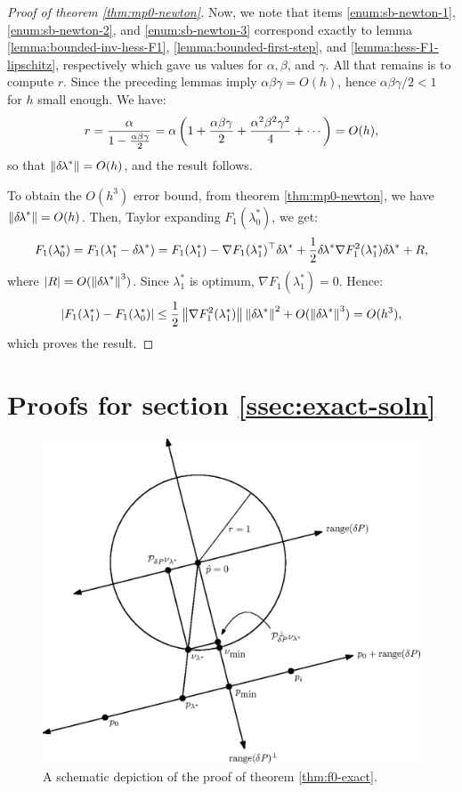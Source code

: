 \documentclass[smallcondensed]{svjour3}
\begin{document}
\begin{proof}[Proof of theorem \ref{thm:mp0-newton}]
  Now, we note that items \ref{enum:sb-newton-1},
  \ref{enum:sb-newton-2}, and \ref{enum:sb-newton-3} correspond
  exactly to lemma \ref{lemma:bounded-inv-hess-F1},
  \ref{lemma:bounded-first-step}, and \ref{lemma:hess-F1-lipschitz},
  respectively which gave us values for $\alpha, \beta$, and
  $\gamma$. All that remains is to compute $r$. Since the preceding
  lemmas imply $\alpha\beta\gamma = O(h)$, hence
  $\alpha\beta\gamma/2 < 1$ for $h$ small enough. We have:
  \begin{equation}
    r = \frac{\alpha}{1 - \frac{\alpha\beta\gamma}{2}} = \alpha \left(1 + \frac{\alpha\beta\gamma}{2} + \frac{\alpha^2\beta^2\gamma^2}{4} + \cdots\right) = O(h),
  \end{equation}
  so that $\left\|{\delta \hspace{-0.1em} \lambda}^*\right\| = O(h)$, and the result follows.

  To obtain the $O(h^3)$ error bound, from theorem
  \ref{thm:mp0-newton}, we have $\left\|{\delta \hspace{-0.1em} \lambda}^*\right\| = O(h)$. Then,
  Taylor expanding $F_1(\lambda_0^*)$, we get:
  \begin{equation*}
    F_1(\lambda_0^*)
    = F_1(\lambda_1^* - {\delta \hspace{-0.1em} \lambda}^*) = F_1(\lambda_1^*) - \nabla F_1(\lambda_1^*)^\top {\delta \hspace{-0.1em} \lambda}^* + \frac{1}{2} {\delta \hspace{-0.1em} \lambda}^* \nabla F_1^2(\lambda_1^*) {\delta \hspace{-0.1em} \lambda}^* + R,
  \end{equation*}
  where $\left|R\right| = O(\left\|{\delta \hspace{-0.1em} \lambda}^*\right\|^3)$. Since $\lambda_1^*$
  is optimum, $\nabla F_1(\lambda_1^*) = 0$. Hence:
  \begin{equation*}
    \left|F_1(\lambda_1^*) - F_1(\lambda_0^*)\right| \leq \frac{1}{2} \left\|\nabla F_1^2(\lambda_1^*)\right\| \left\|{\delta \hspace{-0.1em} \lambda}^*\right\|^2 + O(\left\|{\delta \hspace{-0.1em} \lambda}^*\right\|^3) = O(h^3),
  \end{equation*}
  which proves the result.
\end{proof}

\section{Proofs for section\@
  \ref{ssec:exact-soln}}\label{sec:exact-soln-proofs}

\begin{figure}
  \vspace{1em}
  \centering \includegraphics[width=0.8\linewidth]{f0-exact.eps}
  \caption{A schematic depiction of the proof of theorem
    \ref{thm:f0-exact}.}\label{fig:f0-exact}
\end{figure}
\end{document}
